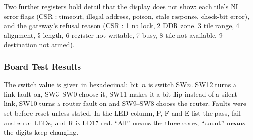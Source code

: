 \documentclass[11pt,a4paper]{article}
\newcommand{\code}[1]{\texttt{\detokenize{#1}}}
\begin{document}
Two further registers hold detail that the display does not show: each
tile's NI error flags (CSR \code{0x004}: timeout, illegal address, poison,
stale response, check-bit error), and the gateway's refusal reason (CSR
\code{0x118}: 1 no lock, 2 DDR zone, 3 tile range, 4 alignment, 5 length,
6 register not writable, 7 busy, 8 tile not available, 9 destination not
armed).

\subsubsection{Board Test Results}

The switch value is given in hexadecimal: bit~$n$ is switch SW$n$. SW12 turns
a link fault on, SW3--SW0 choose it, SW11 makes it a bit-flip instead of a
silent link, SW10 turns a router fault on and SW9--SW8 choose the router.
Faults were set before reset unless stated. In the LED column, P, F and E
list the pass, fail and error LEDs, and R is LD17 red. ``All'' means the
three cores; ``count'' means the digits keep changing.
\end{document}
